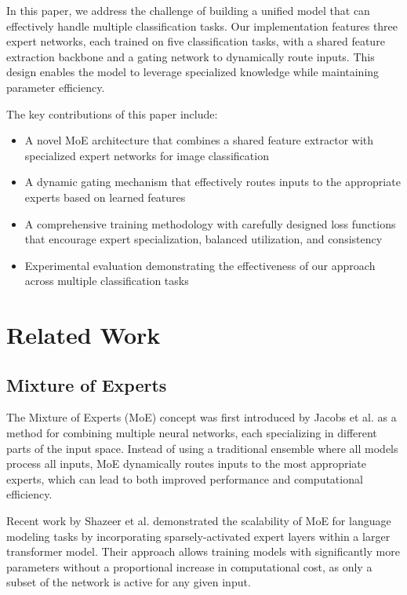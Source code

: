 \documentclass[conference]{IEEEtran}
\begin{document}
In this paper, we address the challenge of building a unified model that can effectively handle multiple classification tasks. Our implementation features three expert networks, each trained on five classification tasks, with a shared feature extraction backbone and a gating network to dynamically route inputs. This design enables the model to leverage specialized knowledge while maintaining parameter efficiency.

The key contributions of this paper include:
\begin{itemize}
    \item A novel MoE architecture that combines a shared feature extractor with specialized expert networks for image classification
    \item A dynamic gating mechanism that effectively routes inputs to the appropriate experts based on learned features
    \item A comprehensive training methodology with carefully designed loss functions that encourage expert specialization, balanced utilization, and consistency
    \item Experimental evaluation demonstrating the effectiveness of our approach across multiple classification tasks
\end{itemize}

\section{Related Work}
\subsection{Mixture of Experts}
The Mixture of Experts (MoE) concept was first introduced by Jacobs et al. \cite{jacobs1991adaptive} as a method for combining multiple neural networks, each specializing in different parts of the input space. Instead of using a traditional ensemble where all models process all inputs, MoE dynamically routes inputs to the most appropriate experts, which can lead to both improved performance and computational efficiency.

Recent work by Shazeer et al. \cite{shazeer2017outrageously} demonstrated the scalability of MoE for language modeling tasks by incorporating sparsely-activated expert layers within a larger transformer model. Their approach allows training models with significantly more parameters without a proportional increase in computational cost, as only a subset of the network is active for any given input.
\end{document}
